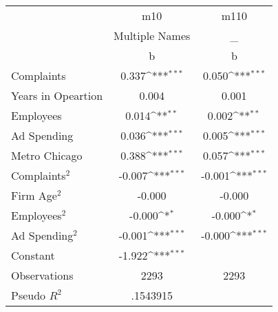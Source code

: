 {
\def\sym#1{\ifmmode^{#1}\else\(^{#1}\)\fi}
\begin{tabular}{l*{2}{c}}
\toprule
                    &         m10         &        m110         \\
                    &Multiple Names         &           \_         \\
                    &           b         &           b         \\
\midrule
Complaints          &       0.337\sym{***}&       0.050\sym{***}\\
Years in Opeartion  &       0.004         &       0.001         \\
Employees           &       0.014\sym{**} &       0.002\sym{**} \\
Ad Spending         &       0.036\sym{***}&       0.005\sym{***}\\
Metro Chicago       &       0.388\sym{***}&       0.057\sym{***}\\
Complaints$^{2}$    &      -0.007\sym{***}&      -0.001\sym{***}\\
Firm Age$^{2}$      &      -0.000         &      -0.000         \\
Employees$^{2}$     &      -0.000\sym{*}  &      -0.000\sym{*}  \\
Ad Spending$^{2}$   &      -0.001\sym{***}&      -0.000\sym{***}\\
Constant            &      -1.922\sym{***}&                     \\
\midrule
Observations        &        2293         &        2293         \\
Pseudo \(R^{2}\)    &    .1543915         &                     \\
\bottomrule
\end{tabular}
}
